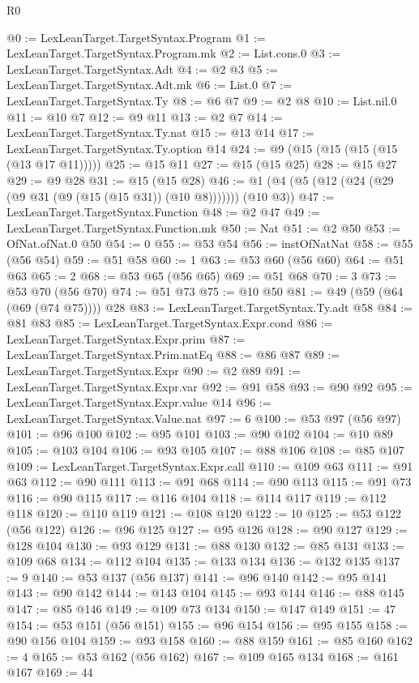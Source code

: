 \begin{lexlean}{R0}
\begin{coremodule}
@0 := LexLeanTarget.TargetSyntax.Program
@1 := LexLeanTarget.TargetSyntax.Program.mk
@2 := List.cons.{0}
@3 := LexLeanTarget.TargetSyntax.Adt
@4 := @2 @3
@5 := LexLeanTarget.TargetSyntax.Adt.mk
@6 := List.{0}
@7 := LexLeanTarget.TargetSyntax.Ty
@8 := @6 @7
@9 := @2 @8
@10 := List.nil.{0}
@11 := @10 @7
@12 := @9 @11
@13 := @2 @7
@14 := LexLeanTarget.TargetSyntax.Ty.nat
@15 := @13 @14
@17 := LexLeanTarget.TargetSyntax.Ty.option @14
@24 := @9 (@15 (@15 (@15 (@15 (@13 @17 @11)))))
@25 := @15 @11
@27 := @15 (@15 @25)
@28 := @15 @27
@29 := @9 @28
@31 := @15 (@15 @28)
@46 := @1 (@4 (@5 (@12 (@24 (@29 (@9 @31 (@9 (@15 (@15 @31)) (@10 @8))))))) (@10 @3))
@47 := LexLeanTarget.TargetSyntax.Function
@48 := @2 @47
@49 := LexLeanTarget.TargetSyntax.Function.mk
@50 := Nat
@51 := @2 @50
@53 := OfNat.ofNat.{0} @50
@54 := 0
@55 := @53 @54
@56 := instOfNatNat
@58 := @55 (@56 @54)
@59 := @51 @58
@60 := 1
@63 := @53 @60 (@56 @60)
@64 := @51 @63
@65 := 2
@68 := @53 @65 (@56 @65)
@69 := @51 @68
@70 := 3
@73 := @53 @70 (@56 @70)
@74 := @51 @73
@75 := @10 @50
@81 := @49 (@59 (@64 (@69 (@74 @75)))) @28
@83 := LexLeanTarget.TargetSyntax.Ty.adt @58
@84 := @81 @83
@85 := LexLeanTarget.TargetSyntax.Expr.cond
@86 := LexLeanTarget.TargetSyntax.Expr.prim
@87 := LexLeanTarget.TargetSyntax.Prim.natEq
@88 := @86 @87
@89 := LexLeanTarget.TargetSyntax.Expr
@90 := @2 @89
@91 := LexLeanTarget.TargetSyntax.Expr.var
@92 := @91 @58
@93 := @90 @92
@95 := LexLeanTarget.TargetSyntax.Expr.value @14
@96 := LexLeanTarget.TargetSyntax.Value.nat
@97 := 6
@100 := @53 @97 (@56 @97)
@101 := @96 @100
@102 := @95 @101
@103 := @90 @102
@104 := @10 @89
@105 := @103 @104
@106 := @93 @105
@107 := @88 @106
@108 := @85 @107
@109 := LexLeanTarget.TargetSyntax.Expr.call
@110 := @109 @63
@111 := @91 @63
@112 := @90 @111
@113 := @91 @68
@114 := @90 @113
@115 := @91 @73
@116 := @90 @115
@117 := @116 @104
@118 := @114 @117
@119 := @112 @118
@120 := @110 @119
@121 := @108 @120
@122 := 10
@125 := @53 @122 (@56 @122)
@126 := @96 @125
@127 := @95 @126
@128 := @90 @127
@129 := @128 @104
@130 := @93 @129
@131 := @88 @130
@132 := @85 @131
@133 := @109 @68
@134 := @112 @104
@135 := @133 @134
@136 := @132 @135
@137 := 9
@140 := @53 @137 (@56 @137)
@141 := @96 @140
@142 := @95 @141
@143 := @90 @142
@144 := @143 @104
@145 := @93 @144
@146 := @88 @145
@147 := @85 @146
@149 := @109 @73 @134
@150 := @147 @149
@151 := 47
@154 := @53 @151 (@56 @151)
@155 := @96 @154
@156 := @95 @155
@158 := @90 @156 @104
@159 := @93 @158
@160 := @88 @159
@161 := @85 @160
@162 := 4
@165 := @53 @162 (@56 @162)
@167 := @109 @165 @134
@168 := @161 @167
@169 := 44

\end{coremodule}
\end{lexlean}
